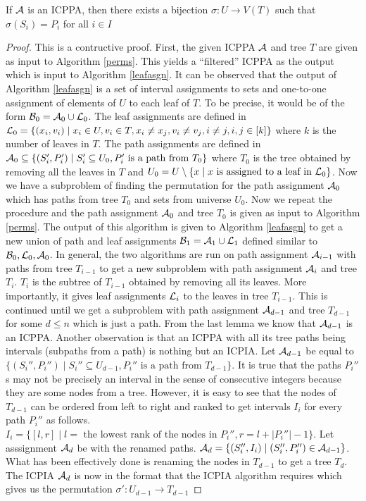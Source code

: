 \documentclass[MS]             %
              {iitmdiss_as}    %
\begin{document}
\begin{theorem}
  \label{th:perm}
  If ${\cal A}$ is an ICPPA, then there exists a bijection $\sigma : U
  \rightarrow V(T)$ such that $\sigma(S_i) = P_i$ for all $i \in I$
\end{theorem}
\begin{proof}
  This is a contructive proof. First, the given ICPPA ${\cal A}$ and tree
  $T$ are given as input to Algorithm \ref{perms}. This yields a
  ``filtered'' ICPPA as the output which is input to Algorithm
  \ref{leafasgn}.  It can be observed that the output of Algorithm
  \ref{leafasgn} is a set of interval assignments to sets and
  one-to-one assignment of elements of $U$ to each leaf of $T$. To be
  precise, it would be of the form ${\cal B}_0 = {\cal A}_0 \cup {\cal L}_0$. The
  leaf assignments are defined in ${\cal L}_0 = \{ (x_i,v_i) \mid x_i \in
  U, v_i \in T, x_i \ne x_j, v_i \ne v_j, i \ne j, i,j \in [k] \}$
  where $k$ is the number of leaves in $T$. The path assignments are
  defined in ${\cal A}_0 \subseteq \{(S_i',P_i') \mid S_i' \subseteq U_0,
  P_i' \text{ is a path from } T_0\}$ where $T_0$ is the tree obtained
  by removing all the leaves in $T$ and $U_0 = U \setminus \{ x \mid x
  \text{ is assigned to a leaf in }{\cal L}_0 \}$. Now we have a subproblem
  of finding the permutation for the path assignment ${\cal A}_0$ which has
  paths from tree $T_0$ and sets from universe $U_0$. Now we repeat
  the procedure and the path assignment ${\cal A}_0$ and tree $T_0$ is
  given as input to Algorithm \ref{perms}. The output of this
  algorithm is given to Algorithm \ref{leafasgn} to get a new union of
  path and leaf assignments ${\cal B}_1 = {\cal A}_1 \cup {\cal L}_1$ defined similar
  to ${\cal B}_0, {\cal L}_0, {\cal A}_0$. In general, the two algorithms are run on
  path assignment ${\cal A}_{i-1}$ with paths from tree $T_{i-1}$ to get a
  new subproblem with path assignment ${\cal A}_i$ and tree $T_{i}$. $T_i$
  is the subtree of $T_{i-1}$ obtained by removing all its
  leaves. More importantly, it gives leaf assignments ${\cal L}_{i}$ to the
  leaves in tree $T_{i-1}$. This is continued until we get a
  subproblem with path assignment ${\cal A}_{d-1}$ and tree $T_{d-1}$ for
  some $d \le n$ which is just a path. From the last lemma we know
  that ${\cal A}_{d-1}$ is an ICPPA. Another observation is that an ICPPA
  with all its tree paths being intervals (subpaths from a path) is
  nothing but an ICPIA\cite{nsnrs09}.  Let ${\cal A}_{d-1}$ be equal to
  $\{(S_i'',P_i'') \mid S_i'' \subseteq U_{d-1}, P_i'' \text{ is a
    path from } T_{d-1} \}$. It is true that the paths $P_i''$s may
  not be precisely an interval in the sense of consecutive integers
  because they are some nodes from a tree. However, it is easy to see
  that the nodes of $T_{d-1}$ can be ordered from left to right and
  ranked to get intervals $I_i$ for every path $P_i''$ as
  follows. $I_i = \{[l,r] \mid l = \text{ the lowest rank of the nodes
    in }P_i'', r = l+|P_i''|-1 \}$. Let asssignment ${\cal A}_d$ be with
  the renamed paths. ${\cal A}_d = \{ (S_i'', I_i) \mid (S_i'', P_i'') \in
  {\cal A}_{d-1} \}$. What has been effectively done is renaming the nodes
  in $T_{d-1}$ to get a tree $T_d$.  The ICPIA ${\cal A}_d$ is now in the
  format that the ICPIA algorithm requires which gives us the
  permutation $\sigma' : U_{d-1} \rightarrow T_{d-1}$


\end{proof}
\end{document}
